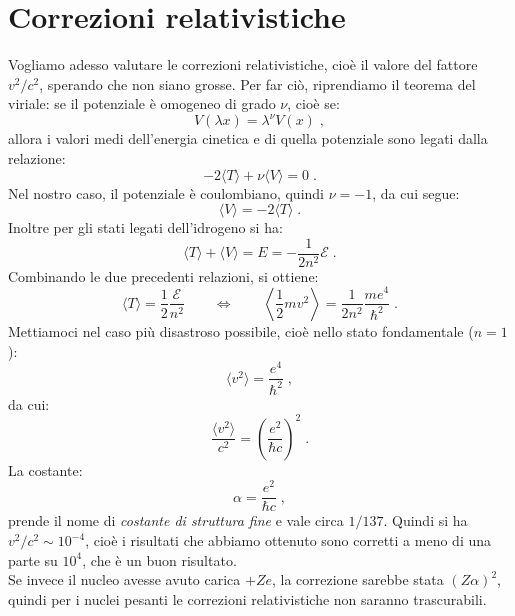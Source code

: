 \documentclass[10pt,a4paper]{report}
\theoremstyle{definition}
\numberwithin{equation}{section}
\newcommand{\bra}{\langle}
\newcommand{\ket}{\rangle}
\begin{document}
\section{Correzioni relativistiche}
Vogliamo adesso valutare le correzioni relativistiche, cioè il valore del fattore $v^2/c^2$, sperando che non siano grosse. Per far ciò, riprendiamo il teorema del viriale: se il potenziale è omogeneo di grado $\nu$, cioè se:
\begin{equation}
V(\lambda x)=\lambda^\nu V(x)\;,
\end{equation}
allora i valori medi dell'energia cinetica e di quella potenziale sono legati dalla relazione:
\begin{equation}
-2\bra T\ket+\nu\bra V\ket=0\;.
\end{equation}
Nel nostro caso, il potenziale è coulombiano, quindi $\nu=-1$, da cui segue:
\begin{equation}
\bra V\ket =-2\bra T \ket\;.
\end{equation}
Inoltre per gli stati legati dell'idrogeno si ha:
\begin{equation}
\bra T\ket+\bra V\ket=E=-\frac{1}{2n^2}\mathcal{E}\;.
\end{equation}
Combinando le due precedenti relazioni, si ottiene:
\begin{equation}
\bra T\ket=\frac{1}{2}\frac{\mathcal{E}}{n^2} \qquad \Longleftrightarrow \qquad \left\langle \frac{1}{2}mv^2\right\rangle=\frac{1}{2n^2}\frac{me^4}{\hbar^2}\;.
\end{equation}
Mettiamoci nel caso più disastroso possibile, cioè nello stato fondamentale ($n=1$):
\begin{equation}
\bra v^2\ket=\frac{e^4}{\hbar^2}\;,
\end{equation}
da cui:
\begin{equation}
\frac{\bra v^2\ket}{c^2}=\left(\frac{e^2}{\hbar c}\right)^2\;.
\end{equation}
La costante:
\begin{equation}
\alpha=\frac{e^2}{\hbar c}\;,
\end{equation}
prende il nome di \textit{costante di struttura fine} e vale circa $1/137$. Quindi si ha $v^2/c^2\sim 10^{-4}$, cioè i risultati che abbiamo ottenuto sono corretti a meno di una parte su $10^4$, che è un buon risultato. \\
Se invece il nucleo avesse avuto carica $+Ze$, la correzione sarebbe stata $(Z\alpha)^2$, quindi per i nuclei pesanti le correzioni relativistiche non saranno trascurabili. \\
\end{document}
